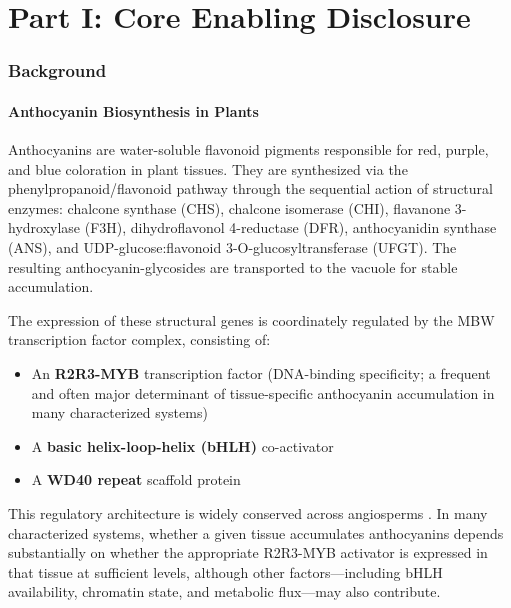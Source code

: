 \documentclass[12pt,a4paper]{article}
\begin{document}
\tableofcontents
\newpage

\part*{Part I: Core Enabling Disclosure}

\section{Background}

\subsection{Anthocyanin Biosynthesis in Plants}

Anthocyanins are water-soluble flavonoid pigments responsible for red, purple, and blue coloration in plant tissues. They are synthesized via the phenylpropanoid/flavonoid pathway through the sequential action of structural enzymes: chalcone synthase (CHS), chalcone isomerase (CHI), flavanone 3-hydroxylase (F3H), dihydroflavonol 4-reductase (DFR), anthocyanidin synthase (ANS), and UDP-glucose:flavonoid 3-O-glucosyltransferase (UFGT). The resulting anthocyanin-glycosides are transported to the vacuole for stable accumulation.

The expression of these structural genes is coordinately regulated by the MBW transcription factor complex, consisting of:
\begin{itemize}
  \item An \textbf{R2R3-MYB} transcription factor (DNA-binding specificity; a frequent and often major determinant of tissue-specific anthocyanin accumulation in many characterized systems)
  \item A \textbf{basic helix-loop-helix (bHLH)} co-activator
  \item A \textbf{WD40 repeat} scaffold protein
\end{itemize}

This regulatory architecture is widely conserved across angiosperms \citep{Gonzali2009}. In many characterized systems, whether a given tissue accumulates anthocyanins depends substantially on whether the appropriate R2R3-MYB activator is expressed in that tissue at sufficient levels, although other factors---including bHLH availability, chromatin state, and metabolic flux---may also contribute.
\end{document}
